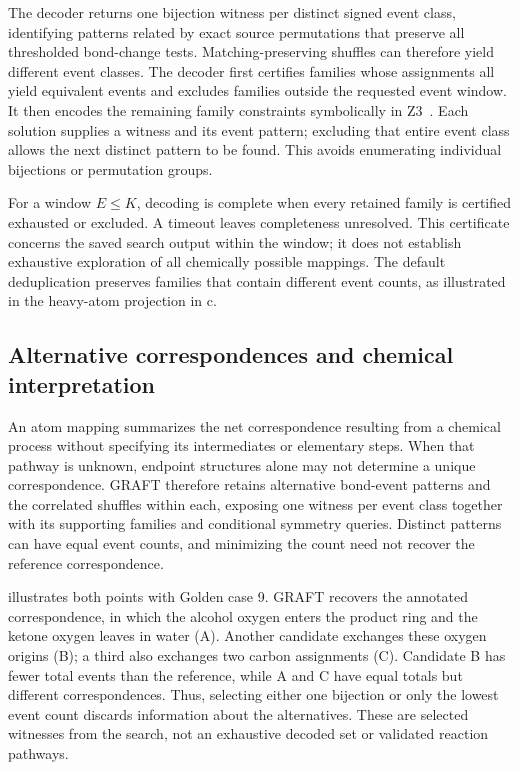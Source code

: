 The decoder returns one bijection witness per distinct signed event class, identifying patterns related by exact source permutations that preserve all thresholded bond-change tests. Matching-preserving shuffles can therefore yield different event classes. The decoder first certifies families whose assignments all yield equivalent events and excludes families outside the requested event window. It then encodes the remaining family constraints symbolically in Z3~\citep{demoura2008}. Each solution supplies a witness and its event pattern; excluding that entire event class allows the next distinct pattern to be found. This avoids enumerating individual bijections or permutation groups.

For a window $E\leq K$, decoding is complete when every retained family is certified exhausted or excluded. A timeout leaves completeness unresolved. This certificate concerns the saved search output within the window; it does not establish exhaustive exploration of all chemically possible mappings. The default deduplication preserves families that contain different event counts, as illustrated in the heavy-atom projection in c.

\FloatBarrier
\subsection{Alternative correspondences and chemical interpretation}

An atom mapping summarizes the net correspondence resulting from a chemical process without specifying its intermediates or elementary steps. When that pathway is unknown, endpoint structures alone may not determine a unique correspondence. GRAFT therefore retains alternative bond-event patterns and the correlated shuffles within each, exposing one witness per event class together with its supporting families and conditional symmetry queries. Distinct patterns can have equal event counts, and minimizing the count need not recover the reference correspondence.

 illustrates both points with Golden case 9. GRAFT recovers the annotated correspondence, in which the alcohol oxygen enters the product ring and the ketone oxygen leaves in water (A). Another candidate exchanges these oxygen origins (B); a third also exchanges two carbon assignments (C). Candidate B has fewer total events than the reference, while A and C have equal totals but different correspondences. Thus, selecting either one bijection or only the lowest event count discards information about the alternatives. These are selected witnesses from the search, not an exhaustive decoded set or validated reaction pathways.


